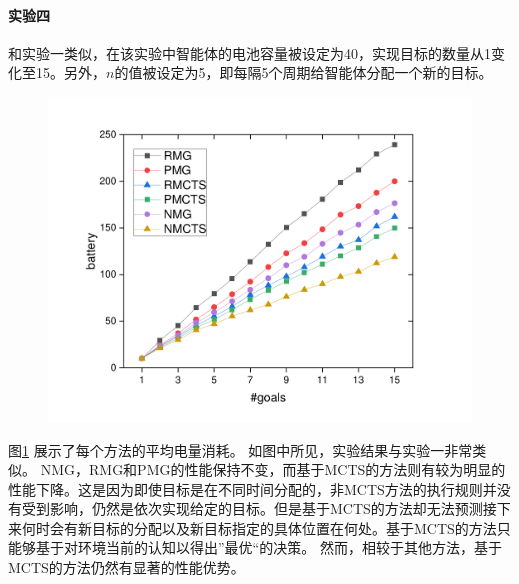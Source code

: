 \paragraph{实验四}
和实验一类似，在该实验中智能体的电池容量被设定为40，实现目标的数量从1变化至15。另外，$n$的值被设定为5，即每隔5个周期给智能体分配一个新的目标。
\begin{figure}[h!]
\centering
\includegraphics[scale=0.4]{./figs/gX_cY_fixCap40_d}
\captionsetup{justification=centering}
\label{fig:dynamic1}
\end{figure}

图\ref{fig:dynamic1} 展示了每个方法的平均电量消耗。
%
如图中所见，实验结果与实验一非常类似。
%
NMG，RMG和PMG的性能保持不变，而基于MCTS的方法则有较为明显的性能下降。这是因为即使目标是在不同时间分配的，非MCTS方法的执行规则并没有受到影响，仍然是依次实现给定的目标。但是基于MCTS的方法却无法预测接下来何时会有新目标的分配以及新目标指定的具体位置在何处。基于MCTS的方法只能够基于对环境当前的认知以得出”最优“的决策。
%
然而，相较于其他方法，基于MCTS的方法仍然有显著的性能优势。

